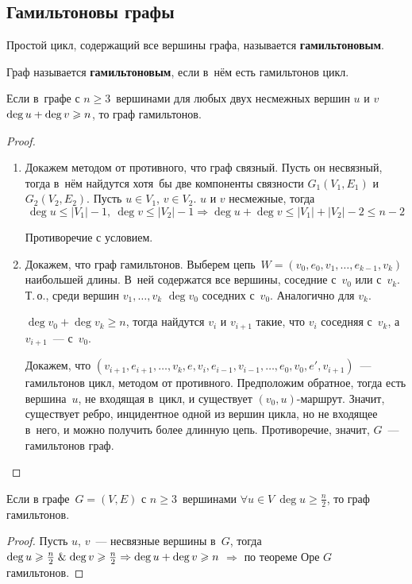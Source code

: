 \subsection{Гамильтоновы графы}
Простой цикл, содержащий все вершины графа, называется \textbf{гамильтоновым}.

 Граф называется \textbf{гамильтоновым}, если в~нём есть гамильтонов цикл.

\begin{theorem}[Оре]
Если в~графе с $n \geqslant 3$~вершинами для любых двух несмежных вершин $u$ и $v$ $\deg u \opbr+ \deg v \opbr\geqslant n$, то граф гамильтонов.
\end{theorem}
\begin{proof}
\begin{enumerate}
	\item Докажем методом от противного, что граф связный.
	Пусть он несвязный, тогда в~нём найдутся хотя~бы две компоненты связности $G_1(V_1, E_1)$ и $G_2(V_2, E_2)$.
	Пусть $u \in V_1$, $v \in V_2$.
	$u$ и $v$ несмежные, тогда
	\begin{equation*}
	\deg u \leqslant |V_1| - 1, \ \deg v \leqslant |V_2| - 1 \Rightarrow \deg u + \deg v \leqslant |V_1| + |V_2| - 2 \leqslant n - 2
	\end{equation*}
	
	Противоречие с условием.
	
	\item Докажем, что граф гамильтонов.
	Выберем цепь~$W = (v_0, e_0, v_1, \ldots, e_{k-1}, v_k)$ наибольшей длины.
	В~ней содержатся все вершины, соседние с~$v_0$ или с~$v_k$.
	Т.\,о., среди вершин $v_1, \ldots, v_k$ $\deg v_0$ соседних с~$v_0$.
	Аналогично для $v_k$.
	
	$\deg v_0 + \deg v_k \geqslant n$, тогда найдутся $v_i$ и $v_{i+1}$ такие, что $v_i$ соседняя с~$v_k$, а $v_{i+1}$~--- с~$v_0$.
	
	Докажем, что $(v_{i+1}, e_{i+1}, \ldots, v_k, e, v_i, e_{i-1}, v_{i-1}, \ldots, e_0, v_0, e', v_{i+1})$~--- гамильтонов цикл, методом от противного.
	Предположим обратное, тогда есть вершина~$u$, не входящая в~цикл, и существует $(v_0, u)$-маршрут.
	Значит, существует ребро, инцидентное одной из вершин цикла, но не входящее в~него, и можно получить более длинную цепь.
	Противоречие, значит, $G$~--- гамильтонов граф.
\end{enumerate}
\end{proof}

\begin{theorem}[Дирака]
\label{th:Dirac}
Если в графе~$G = (V, E)$ с $n \geqslant 3$~вершинами $\forall u \in V \ \deg u \geqslant \frac{n}2$, то граф гамильтонов.
\end{theorem}
\begin{proof}
Пусть $u$, $v$~--- несвязные вершины в~$G$, тогда $\deg u \geqslant \frac{n}2 \mathrel{\&} \deg v \geqslant \frac{n}2 \Rightarrow \deg u + \deg v \geqslant n$ $\Rightarrow$ по теореме Оре $G$ гамильтонов.
\end{proof}

